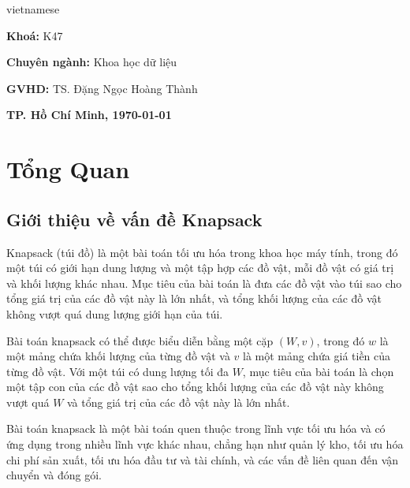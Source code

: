 \documentclass[a4paper]{article}
\begin{document}
\begin{otherlanguage*}{vietnamese}
\begin{titlepage}
\begin{center}

\textbf{Khoá:} K47

\textbf{Chuyên ngành: } Khoa học dữ liệu

\end{center}

\begin{center}
\large \textbf{GVHD:} TS. Đặng Ngọc Hoàng Thành\\
\end{center}

\vfill
\begin{center}
\vspace{0.5cm}
\large \textbf{TP. Hồ Chí Minh, {\today}}
\end{center}

\end{titlepage}


\tableofcontents
\pagebreak

\section{Tổng Quan}

\subsection{Giới thiệu về vấn đề Knapsack}
Knapsack (túi đồ) là một bài toán tối ưu hóa trong khoa học máy tính, trong đó một túi có giới hạn dung lượng và một tập hợp các đồ vật, mỗi đồ vật có giá trị và khối lượng khác nhau. Mục tiêu của bài toán là đưa các đồ vật vào túi sao cho tổng giá trị của các đồ vật này là lớn nhất, và tổng khối lượng của các đồ vật không vượt quá dung lượng giới hạn của túi.

Bài toán knapsack có thể được biểu diễn bằng một cặp $(W, v)$, trong đó $w$ là một mảng chứa khối lượng của từng đồ vật và $v$ là một mảng chứa giá tiền của từng đồ vật. Với một túi có dung lượng tối đa $W$, mục tiêu của bài toán là chọn một tập con của các đồ vật sao cho tổng khối lượng của các đồ vật này không vượt quá $W$ và tổng giá trị của các đồ vật này là lớn nhất.

Bài toán knapsack là một bài toán quen thuộc trong lĩnh vực tối ưu hóa và có ứng dụng trong nhiều lĩnh vực khác nhau, chẳng hạn như quản lý kho, tối ưu hóa chi phí sản xuất, tối ưu hóa đầu tư và tài chính, và các vấn đề liên quan đến vận chuyển và đóng gói.


\end{otherlanguage*}
\end{document}
